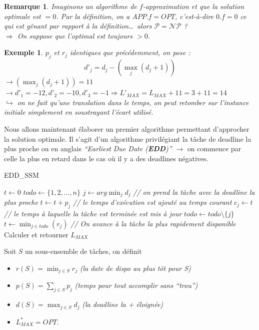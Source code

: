\documentclass[12pt]{article}
\newtheorem{exemple}{Exemple}[section]
\newtheorem{rem}{Remarque}[section]
\begin{document}
\begin{rem}
Imaginons un algorithme de $f$-\textit{approximation} et que la solution
optimale est $=0$. Par la définition, on a $APP.f=OPT$, c'est-à-dire $0.f = 0$
ce qui est gênant par rapport à la définition\dots~alors
$\mathcal{P} = \mathcal{NP}$ ? \\
$\Rightarrow$ On suppose que l'optimal est toujours $> 0$.
\end{rem}

\begin{exemple}
$p_j$ et $r_j$ identiques que précédemment, on pose :
		  $$d'_j = d_j - (\max_j (d_j + 1))$$
$\rightarrow (\max_j (d_j + 1)) = 11$\\
$\rightarrow d'_1 = -12, d'_2 = -10, d'_3 = -1 \Rightarrow L'_{MAX} = L_{MAX} +
11 = 3+11 = 14$ \\
$\hookrightarrow$ on ne fait qu'une translation dans le temps, on peut retomber
sur l'instance initiale simplement en soustrayant l'écart utilisé.
\end{exemple}

Nous allons maintenant élaborer un premier algorithme permettant d'approcher la
solution optimale. Il s'agit d'un algorithme privilégiant la tâche de deadline
la plus proche ou en anglais \textit{``Earliest Due Date (\textbf{EDD})''}
$\rightarrow$ on commence par celle la plus en retard dans le cas où il y a des
deadlines négatives.

\begin{algorithm}[h!]
\caption{EDD\_SSM}
\begin{algorithmic}[1]
\STATE $t\leftarrow 0$
\STATE $todo \leftarrow \{1,2,\ldots,n\}$
\STATE $j\leftarrow arg\min_j{d_j}$ \textit{// on prend la tâche avec la deadline
	la plus proche}
\STATE $t\leftarrow t+p_j$ \textit{// le temps d'exécution est ajouté au temps
courant}
\STATE $c_j \leftarrow t$ \textit{// le temps à laquelle la tâche est terminée
est mis à jour}
\STATE $todo \leftarrow todo \setminus \{j\}$
\ELSE
\STATE $t\leftarrow \min_{j\in todo}(r_j)$ \textit{// On avance à la tâche la
plus rapidement disponible}
\ENDIF
\ENDWHILE
\STATE Calculer et retourner $L_{MAX}$
\end{algorithmic}
\end{algorithm}

Soit $S$ un sous-ensemble de tâches, on définit
\begin{itemize}
\item $r(S) = \min_{j\in S} r_j$ \textit{(la date de dispo au plus tôt pour S)}
\item $p(S) = \sum_{j\in S} p_j$ \textit{(temps pour tout accomplir sans
``trou'')}
\item $d(S) = \max_{j\in S} d_j$ \textit{(la deadline la + éloignée)}
\item $L^*_{MAX} = OPT$.
\end{itemize}
\end{document}
